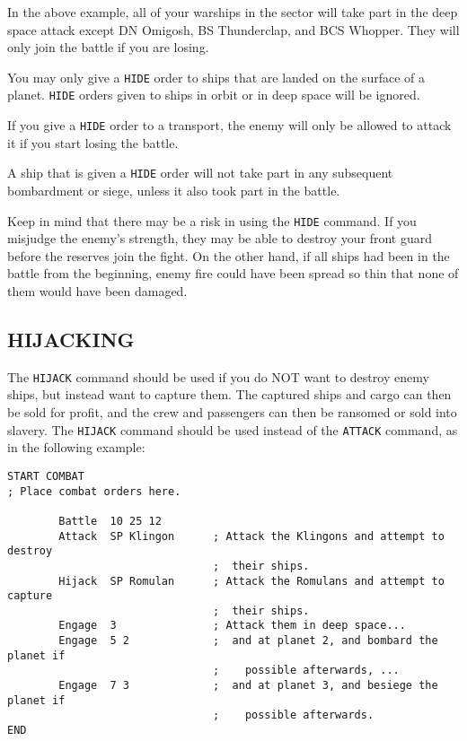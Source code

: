 \documentclass[10pt,titlepage]{article}
\begin{document}
In the above example, all of your warships in the sector will take part in the
deep space attack except DN Omigosh, BS Thunderclap, and BCS Whopper.  They
will only join the battle if you are losing.

You may only give a \texttt{HIDE} order to ships that are landed on the surface of a
planet.  \texttt{HIDE} orders given to ships in orbit or in deep space will be ignored.

If you give a \texttt{HIDE} order to a transport, the enemy will only be allowed to
attack it if you start losing the battle.

A ship that is given a \texttt{HIDE} order will not take part in any subsequent
bombardment or siege, unless it also took part in the battle.

Keep in mind that there may be a risk in using the \texttt{HIDE} command.  If you
misjudge the enemy's strength, they may be able to destroy your front guard
before the reserves join the fight.  On the other hand, if all ships had been
in the battle from the beginning, enemy fire could have been spread so thin
that none of them would have been damaged.


\subsection{HIJACKING}
\label{sec:hijacking}


The \texttt{HIJACK} command should be used if you do NOT want to destroy enemy ships,
but instead want to capture them.  The captured ships and cargo can then be
sold for profit, and the crew and passengers can then be ransomed or sold into
slavery.  The \texttt{HIJACK} command should be used instead of the \texttt{ATTACK} command, as
in the following example:

\begin{verbatim}
START COMBAT
; Place combat orders here.

        Battle  10 25 12
        Attack  SP Klingon      ; Attack the Klingons and attempt to destroy
                                ;  their ships.
        Hijack  SP Romulan      ; Attack the Romulans and attempt to capture
                                ;  their ships.
        Engage  3               ; Attack them in deep space...
        Engage  5 2             ;  and at planet 2, and bombard the planet if
                                ;    possible afterwards, ...
        Engage  7 3             ;  and at planet 3, and besiege the planet if
                                ;    possible afterwards.
END
\end{verbatim} 
\end{document}
